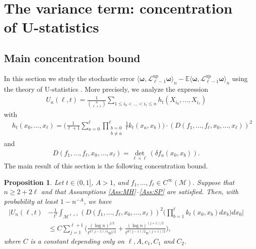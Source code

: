 \documentclass[10pt]{article}
\DeclareMathOperator{\up}{up}
\theoremstyle{plain}
\newtheorem{proposition}{Proposition}
\theoremstyle{definition}
\theoremstyle{remark}
\begin{document}
    
\section{The variance term: concentration of U-statistics}\label{section:variance}


\subsection{Main concentration bound}

In this section we study the stochastic error $\langle\boldsymbol{\omega},\mathscr{L}_{\ell-1}^{\up}\boldsymbol{\omega}\rangle_n-\mathbb{E} \langle\boldsymbol{\omega},\mathscr{L}_{\ell-1}^{\up}\boldsymbol{\omega}\rangle_n$ using the theory of U-statistics \cite{Lee90,PG99}. More precisely, we analyze the expression 
\begin{align}\label{eq:U:statistics}
    U_{n}(\ell,t)=\frac{1}{\binom{n}{\ell+1}}\sum_{1\leq i_0<\dots<i_\ell\leq n}h_t(X_{i_0},\dots,X_{i_\ell})
\end{align}
with 
\begin{align*}
    &h_t(x_0,\dots,x_\ell)=\Big(\frac{1}{\ell+1}\sum_{a=0}^\ell\prod_{\substack{b=0\\b\neq a}}^\ell\frac{1}{t}k_t(x_a,x_b)\Big)\cdot (D(f_1,\dots,f_\ell,x_0,\dots,x_\ell))^2
\end{align*}
and
\begin{align*}
    D(f_1,\dots,f_\ell,x_0,\dots,x_\ell)=\det_{\ell\times\ell}(\delta f_a(x_0,x_b)).
\end{align*}
The main result of this section is the following concentration bound.

\begin{proposition}\label{Prop:conc:U:statistic}
    Let $t\in(0,1]$, $A>1$, and $f_1,\dots,f_\ell\in C^\infty(\mathcal{M})$. Suppose that $n\geq 2+2\ell$ and that Assumptions \ref{Ass:MH}--\ref{Ass:SP} are satisfied. Then, with probability at least $1-n^{-A}$, we have
    \begin{align*}
        \Big| U_{n}(\ell,t)&-\frac{1}{t^\ell}\int_{\mathcal{M}^{\ell+1}}(D(f_1,\dots,f_\ell,x_0,\dots,x_\ell))^2\Big(\prod_{b=1}^\ell k_t(x_0,x_b)dx_b\Big)dx_0 \Big|\\
        &\leq C\sum_{j=1}^{\ell+1}\Big(\frac{(\log n)^{j/2}}{t^{d(j-1)/4}n^{j/2}}+\frac{(\log n)^{(j+1)/2}}{t^{d(j-1)/2}n^{(j+1)/2}}\Big),
    \end{align*}
    where $C$ is a constant depending only on $\ell, A, c_1,C_1$ and $C_2$.
\end{proposition}
\end{document}
